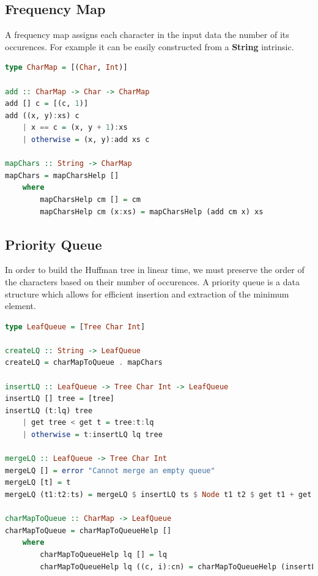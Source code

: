 \documentclass{article}
\begin{document}
\subsection{Frequency Map}

A frequency map assigns each character in the input data the number of its occurences.
For example it can be easily constructed from a \textbf{String} intrinsic.

\begin{lstlisting}[language=Haskell, caption={Constructing a frequency map from a string.}]
type CharMap = [(Char, Int)]

add :: CharMap -> Char -> CharMap
add [] c = [(c, 1)]
add ((x, y):xs) c
    | x == c = (x, y + 1):xs
    | otherwise = (x, y):add xs c

mapChars :: String -> CharMap
mapChars = mapCharsHelp []
    where
        mapCharsHelp cm [] = cm
        mapCharsHelp cm (x:xs) = mapCharsHelp (add cm x) xs
\end{lstlisting}

\subsection{Priority Queue}

In order to build the Huffman tree in linear time, we must preserve the order of
the characters based on their number of occurences. A priority queue is a data structure
which allows for efficient insertion and extraction of the minimum element.

\begin{lstlisting}[language=Haskell, caption={Priority queue implementation using a binary tree.}]
type LeafQueue = [Tree Char Int]

createLQ :: String -> LeafQueue
createLQ = charMapToQueue . mapChars

insertLQ :: LeafQueue -> Tree Char Int -> LeafQueue
insertLQ [] tree = [tree]
insertLQ (t:lq) tree
    | get tree < get t = tree:t:lq
    | otherwise = t:insertLQ lq tree

mergeLQ :: LeafQueue -> Tree Char Int
mergeLQ [] = error "Cannot merge an empty queue"
mergeLQ [t] = t
mergeLQ (t1:t2:ts) = mergeLQ $ insertLQ ts $ Node t1 t2 $ get t1 + get t2

charMapToQueue :: CharMap -> LeafQueue
charMapToQueue = charMapToQueueHelp []
    where
        charMapToQueueHelp lq [] = lq
        charMapToQueueHelp lq ((c, i):cn) = charMapToQueueHelp (insertLQ lq $ Leaf c i) cn
\end{lstlisting}
\end{document}
